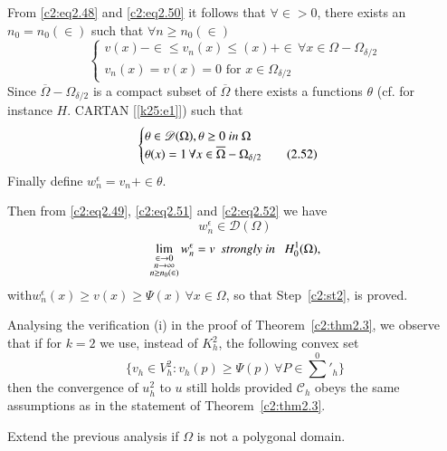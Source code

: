 From \eqref{c2:eq2.48} and \eqref{c2:eq2.50} it follows that $\forall
\in > 0$, there exists an $n_0 = n_0 (\in)$ such that
$\forall n \geq n_0 (\in)$ 
\begin{equation}
\begin{cases}
v (x) - \in \leq v_n (x) \leq (x) + \in\, \forall  x \in
\Omega-\Omega_{\delta / 2}\\ 
v_n (x) = v(x) = 0 \text{ for } x \in \Omega_{\delta/2}
\end{cases}\tag{2.51}\label{c2:eq2.51} 
\end{equation}
Since $\overline{\Omega} - \Omega_{\delta / 2}$ is a compact subset of
$\overline{\Omega}$ there exists a functions $\theta$ (cf. for
instance $H$. CARTAN [\ref{k25:e1}]) such that  
\begin{equation}
\begin{cases}
\theta \in \mathscr{D} (\Omega),  \theta \geq 0~\text{\em in }
\Omega\\ 
\theta (x) = 1\, \forall  x \in \overline{\Omega} - \Omega_{\delta
  /2 }\tag{2.52}\label{c2:eq2.52}  
\end{cases}
\end{equation}
Finally define $w^\epsilon  _n =  v_n + \in \theta$.

Then from \eqref{c2:eq2.49}, \eqref{c2:eq2.51} and \eqref{c2:eq2.52}
we have  
$$
w^\epsilon  _n \in \mathscr{D} (\Omega)
$$ 
$$
\lim_{\substack{\in \to 0 \\ n \to \infty \\ n \geq n_0
    (\in)}} 
w^\epsilon  _n = v~~ \text{\em strongly in }~~ H^1_0(\Omega), 
$$
with\pageoriginale  $w^\epsilon _n (x) \geq v (x) \geq \Psi (x)\,
\forall  x \in \Omega$, so that Step~\ref{c2:st2}, is proved. 

\begin{remark}\label{c2:rem2.4}%
Analysing the verification (i) in the  proof of {\small Theorem~\ref{c2:thm2.3}}, we
observe that if for $k=2$ we use, instead of $K^2_h$, the following
convex set  
$$
\{v_h \in V^2_h : v_h (p) \geq \Psi (p)\, \forall  P \in
\sum^{0}{}'_h \} 
$$ 
then the convergence of $u^2_h$ to $u$ still holds provided $\mathscr{C}_h$
obeys the same assumptions as in the statement of Theorem~\ref{c2:thm2.3}. 
\end{remark}

\begin{exercise}\label{c2:exer2.4}%
Extend the previous analysis if $\Omega $ is not a polygonal domain.
\end{exercise}

